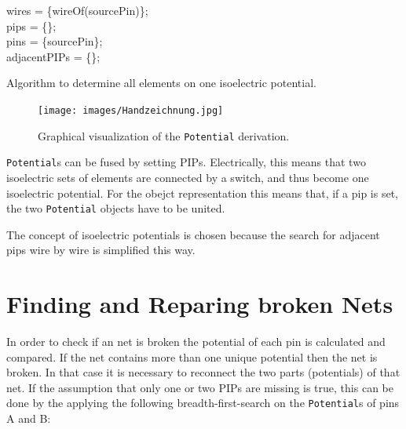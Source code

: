 \begin{algorithm}[h]
	wires = \{wireOf(sourcePin)\};\\
	pips = \{\};\\
	pins = \{sourcePin\};\\
	adjacentPIPs = \{\};\\
	
 \caption{Algorithm to determine all elements on one isoelectric potential.}
 \label{alg:findingpotential}
\end{algorithm}

\begin{figure}
\texttt{[image: images/Handzeichnung.jpg]}
\caption{Graphical visualization of the \texttt{Potential} derivation.}
\label{fig:buildpotential}
\end{figure}



\texttt{Potential}s can be fused by setting PIPs. Electrically, this means that two isoelectric sets of elements are connected by a switch, and thus become one isoelectric potential. For the obejct representation this means that, if a pip is set, the two \texttt{Potential} objects have to be united.

The concept of isoelectric potentials is chosen because the search for adjacent pips wire by wire is simplified this way.



\section{Finding and Reparing broken Nets}
\label{sec:findingandrepairingbrokennets}

In order to check if an net is broken the potential of each pin is calculated and compared. If the net contains more than one unique potential then the net is broken.
In that case it is necessary to reconnect the two parts (potentials) of that net. If the assumption that only one or two PIPs are missing is true, this can be done by the applying the following breadth-first-search on the \texttt{Potential}s of pins A and B:

